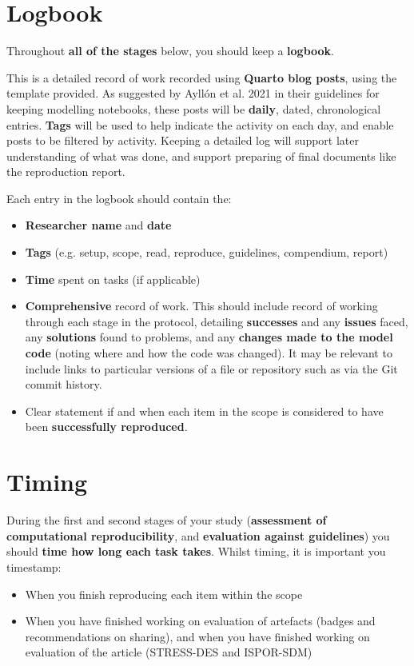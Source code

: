 \newpage
\section{Logbook}

Throughout \textbf{all of the stages} below, you should keep a \textbf{logbook}.

This is a detailed record of work recorded using \textbf{Quarto blog posts}, using the template provided. As suggested by Ayllón et al. 2021\autocite{ayllon_keeping_2021} in their guidelines for keeping modelling notebooks, these posts will be \textbf{daily}, dated, chronological entries. \textbf{Tags} will be used to help indicate the activity on each day, and enable posts to be filtered by activity. Keeping a detailed log will support later understanding of what was done, and support preparing of final documents like the reproduction report.

Each entry in the logbook should contain the:
\begin{itemize}
    \item \textbf{Researcher name} and \textbf{date}
    \item \textbf{Tags} (e.g. setup, scope, read, reproduce, guidelines, compendium, report)
    \item \textbf{Time} spent on tasks (if applicable)
    \item \textbf{Comprehensive} record of work. This should include record of working through each stage in the protocol, detailing \textbf{successes} and any \textbf{issues} faced, any \textbf{solutions} found to problems, and any \textbf{changes made to the model code} (noting where and how the code was changed). It may be relevant to include links to particular versions of a file or repository such as via the Git commit history.
    \item Clear statement if and when each item in the scope is considered to have been \textbf{successfully reproduced}.
\end{itemize}

\newpage
\section{Timing}

During the first and second stages of your study (\textbf{assessment of computational reproducibility}, and \textbf{evaluation against guidelines}) you should \textbf{time how long each task takes}. Whilst timing, it is important you timestamp:
\begin{itemize}
    \item When you finish reproducing each item within the scope
    \item When you have finished working on evaluation of artefacts (badges and recommendations on sharing), and when you have finished working on evaluation of the article (STRESS-DES and ISPOR-SDM)
\end{itemize}

